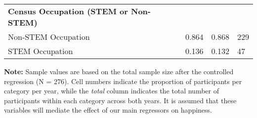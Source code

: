 \begin{center}
\begin{tabularx} {12cm} {@{} l Y Y Y @{}}
\textbf{Census Occupation (STEM or Non-STEM)} \\
Non-STEM Occupation & 0.864 & 0.868 & 229 \\
STEM Occupation & 0.136 & 0.132 & 47 \\
\bottomrule
\end{tabularx}
\par\smallskip\noindent\parbox{12cm}{\raggedright \scriptsize \textbf{Note:} Sample values are based on the total sample size after the controlled regression (N = 276). Cell numbers indicate the proportion of participants per category per year, while the \emph{total} column indicates the total number of participants within each category across both years. It is assumed that these variables will mediate the effect of our main regressors on happiness.}
\normalsize
\end{center}
